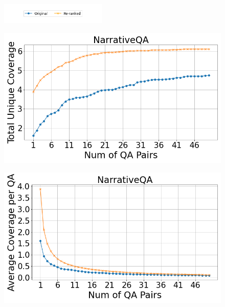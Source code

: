 \documentclass[11pt]{article}
\begin{document}
\begin{figure}[h!]
    \centering
    \includegraphics[width=0.45\textwidth]{submissions/Tung2023/figs/legend.png}\\%

    \begin{minipage}[h]{0.33\linewidth}
        \centering
        \includegraphics[width=\textwidth]{submissions/Tung2023/figs/NarrativeQA_Total Unique Coverage.png}
    \label{fig:narrativeqa-total-unique-coverage}
    \end{minipage}
    \begin{minipage}[h]{0.33\linewidth}
        \centering
        \includegraphics[width=\textwidth]{submissions/Tung2023/figs/NarrativeQA_Average Coverage per QA.png}

\end{minipage}
\end{figure}
\end{document}

